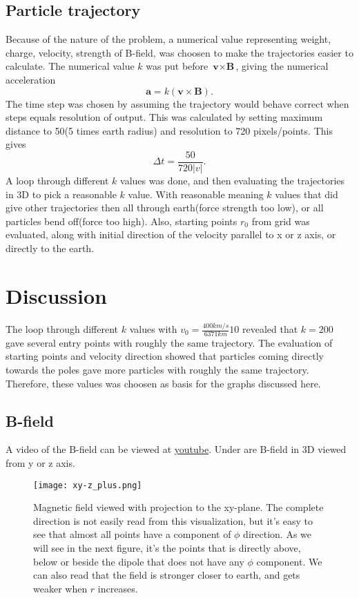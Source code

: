 \documentclass[11pt,a4paper]{article}
\begin{document}
\subsection{Particle trajectory}
Because of the nature of the problem, a numerical value representing weight, charge, velocity, strength of B-field, was choosen to make the trajectories easier to calculate.  The numerical value $k$ was put before $\textbf{v}\times\textbf{B}$, giving the numerical acceleration
\begin{equation}
\label{equation.numericalAcceleration}
\textbf{a} = k(\textbf{v}\times\textbf{B}).
\end{equation}
The time step was chosen by assuming the trajectory would behave correct when steps equals resolution of output. This was calculated by setting maximum distance to 50(5 times earth radius) and resolution to 720 pixels/points. This gives
\begin{equation}
\label{equation.dt}
\Delta t = \frac{50}{720|v|}.
\end{equation}
A loop through different $k$ values was done, and then evaluating the trajectories in 3D to pick a reasonable $k$ value. With reasonable meaning $k$ values that did give other trajectories then all through earth(force strength too low), or all particles bend off(force too high). Also, starting points $r_0$ from grid was evaluated, along with initial direction of the velocity parallel to x or z axis, or directly to the earth.
\section{Discussion}
The loop through different $k$ values with $v_0=\frac{400km/s}{6371km}10$ revealed that $k=200$ gave several entry points with roughly the same trajectory. The evaluation of starting points and velocity direction showed that particles coming directly towards the poles gave more particles with roughly the same trajectory. Therefore, these values was choosen as basis for the graphs discussed here.
\subsection{B-field}
A video of the B-field can be viewed at \href{http://youtube.com/watch?q=adsf}{youtube}. Under are B-field in 3D viewed from y or z axis.
\begin{center}
\begin{figure}[htbp] %
\label{figure.B-field}
\texttt{[image: xy-z\_plus.png]}
\caption{Magnetic field viewed with projection to the xy-plane. The complete direction is not easily read from this visualization, but it's easy to see that almost all points have a component of $\phi$ direction. As we will see in the next figure, it's the points that is directly above, below or beside the dipole that does not have any $\phi$ component. We can also read that the field is stronger closer to earth, and gets weaker when $r$ increases.}
\end{figure}
\end{center}
\end{document}
